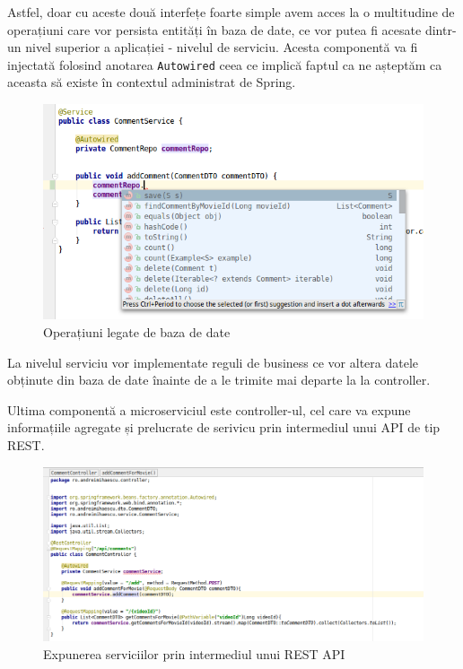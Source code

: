 \documentclass[12pt, a4paper, oneside, romanian]{teza-upb}
\begin{document}
Astfel, doar cu aceste două interfețe foarte simple avem acces la o multitudine de operațiuni care vor persista entități în baza de date, ce vor putea fi acesate dintr-un nivel superior a aplicației - nivelul de serviciu. Acesta componentă va fi injectată folosind anotarea \texttt{Autowired} ceea ce implică faptul ca ne așteptăm ca aceasta să existe în contextul administrat de Spring.

\begin{figure}[ht]
\centering
\includegraphics[scale=0.4]{img/spring-boot-repo-injection.png}
\caption{Operațiuni legate de baza de date}
\label{fig:arhi_componente}
\end{figure}


\newpage
La nivelul serviciu vor implementate reguli de business ce vor altera datele obținute din baza de date înainte de a le trimite mai departe la la controller.

Ultima componentă a microserviciul este controller-ul, cel care va expune informațiile agregate și prelucrate de serivicu prin intermediul unui API de tip REST. 

\begin{figure}[ht]
\centering
\includegraphics[scale=0.5]{img/spring-boot-controller.png}
\caption{Expunerea serviciilor prin intermediul unui REST API}
\label{fig:arhi_componente}
\end{figure}
\end{document}
